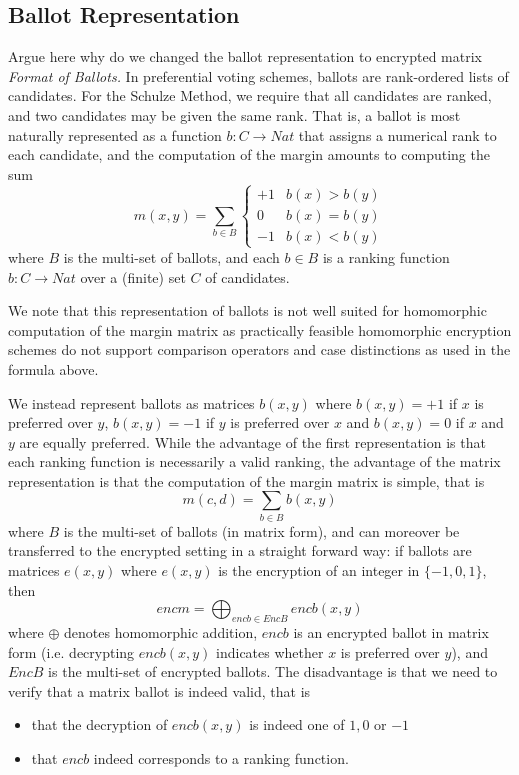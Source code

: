  \subsection{Ballot Representation}
     Argue here why do we changed the ballot representation 
     to encrypted matrix
\smallskip\noindent\emph{Format of Ballots.} In preferential voting
schemes, ballots are rank-ordered lists of candidates. For the
Schulze Method, we require that all candidates are ranked, and two
candidates may be given the same rank. That is, a ballot is most
naturally represented as a function $b: C \to Nat$ that assigns a
numerical rank to each candidate, and the computation of the margin
amounts to computing the sum
\[ m(x, y) = \sum_{b \in B} \begin{cases} +1 & b(x) > b(y) \\ 0 &
b(x) = b(y) \\ -1 & b(x) < b(y) \end{cases} \]
where $B$ is the multi-set of ballots, and each $b \in B$ is a
ranking function $b: C \to Nat$ over a (finite) set $C$ of
candidates. 

We note that this representation of ballots is not well suited for
homomorphic computation of the margin matrix as practically feasible
homomorphic encryption schemes do not support comparison operators
and case distinctions as used in the formula above. 

We instead represent ballots as matrices
$b(x, y)$ where $b(x, y) = +1$ if $x$ is preferred
over $y$, $b(x, y) = -1$ if $y$ is preferred over $x$ and $b(x, y) =
0$ if $x$ and $y$ are equally preferred.
While the advantage of the first representation is that each ranking
function is necessarily a valid ranking, the advantage of the matrix 
representation is that the computation of
the margin matrix is simple, that is
\[ m(c, d) = \sum_{b \in B} b(x, y) \]
where $B$ is the multi-set of ballots (in matrix form), and can
moreover be transferred to the encrypted setting in a straight
forward way: if ballots are matrices $e(x,y)$ where $e(x,y)$ is the
encryption of an integer in $\lbrace -1, 0, 1 \rbrace$, then
\begin{equation}\label{eqn:enc-mm}
encm = \bigoplus_{encb \in EncB} encb(x, y) 
\end{equation}
where $\oplus$ denotes homomorphic addition, $encb$ is an encrypted
ballot in matrix form (i.e. decrypting $encb(x, y)$ indicates
whether $x$ is preferred over $y$), and $EncB$ is the multi-set of
encrypted ballots. The disadvantage is that we need to verify that a
matrix ballot is indeed valid, that is
\begin{itemize}
\item that the decryption of $encb(x, y)$ is indeed one of $1, 0$ or
$-1$
\item that $encb$ indeed corresponds to a ranking function.
\end{itemize}

